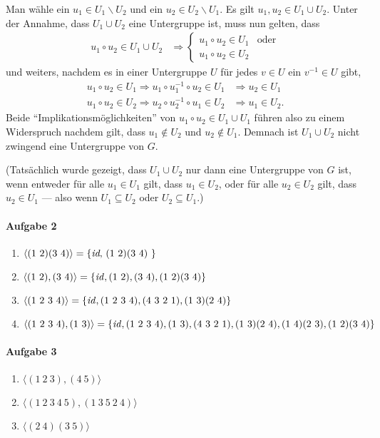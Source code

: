 \documentclass{article}
\begin{document}
\begin{enumerate}
    Man wähle ein $u_1 \in U_1 \backslash U_2$ und ein $u_2 \in U_2 \backslash U_1$. Es gilt $u_1, u_2 \in U_1 \cup U_2$. Unter der Annahme, dass $U_1 \cup U_2$ eine Untergruppe ist, muss nun gelten, dass
    \begin{align*}
        u_1 \circ u_2 \in U_1 \cup U_2 &\Rightarrow \begin{cases}
            u_1 \circ u_2 \in U_1 & \text{oder} \\
            u_1 \circ u_2 \in U_2
        \end{cases}
    \end{align*}
    und weiters, nachdem es in einer Untergruppe $U$ für jedes $v \in U$ ein $v^{-1} \in U$ gibt,
    \begin{align*}
        u_1 \circ u_2 \in U_1 \Rightarrow u_1 \circ u_1^{-1} \circ u_2 \in U_1 &\Rightarrow u_2 \in U_1 \\
        u_1 \circ u_2 \in U_2 \Rightarrow u_2 \circ u_2^{-1} \circ u_1 \in U_2 &\Rightarrow u_1 \in U_2.
    \end{align*}
    Beide \enquote{Implikationsmöglichkeiten} von $u_1 \circ u_2 \in U_1 \cup U_1$ führen also zu einem Widerspruch nachdem gilt, dass $u_1 \notin U_2$ und $u_2 \notin U_1$. Demnach ist $U_1 \cup U_2$ nicht zwingend eine Untergruppe von $G$.

    (Tatsächlich wurde gezeigt, dass $U_1 \cup U_2$ nur dann eine Untergruppe von $G$ ist, wenn entweder für alle $u_1 \in U_1$ gilt, dass $u_1 \in U_2$, oder für alle $u_2 \in U_2$ gilt, dass $u_2 \in U_1$ --- also wenn $U_1 \subseteq U_2$ oder $U_2 \subseteq U_1$.)
\end{enumerate}

\paragraph{Aufgabe 2}

\begin{enumerate}
    \item $\langle (1\ 2)(3\ 4) \rangle = \{ \text{\emph{id}, (1\ 2)(3\ 4) } \}$
    
    \item $\langle (1\ 2), (3\ 4) \rangle = \{ \text{\emph{id}}, (1\ 2), (3\ 4), (1\ 2)(3\ 4) \}$
    
    \item $\langle (1\ 2\ 3\ 4) \rangle = \{ \text{\emph{id}}, (1\ 2\ 3\ 4), (4\ 3\ 2\ 1), (1\ 3)(2\ 4) \}$
    
    \item $\langle (1\ 2\ 3\ 4), (1\ 3) \rangle = \{ \text{\emph{id}}, (1\ 2\ 3\ 4), (1\ 3), (4\ 3\ 2\ 1), (1\ 3)(2\ 4), (1\ 4)(2\ 3), (1\ 2)(3\ 4) \}$
\end{enumerate}

\paragraph{Aufgabe 3}

\begin{enumerate}
    \item $\langle (1\ 2\ 3), (4\ 5) \rangle$
    \item $\langle (1\ 2\ 3\ 4\ 5), (1\ 3\ 5\ 2\ 4) \rangle$
    \item $\langle (2\ 4)(3\ 5) \rangle$
\end{enumerate}
\end{document}
